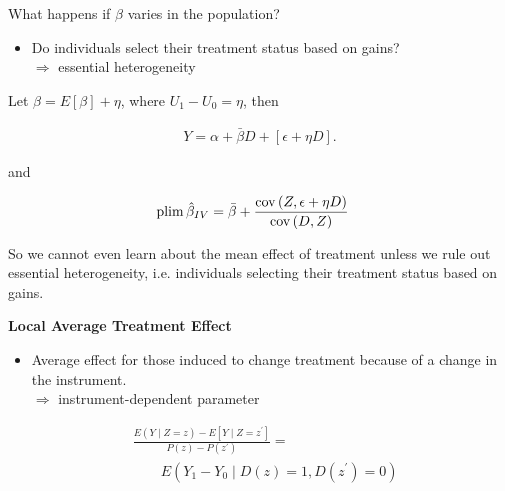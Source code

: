 \begin{frame}
What happens if $\beta$ varies in the population?\vspace{0.3cm}
\begin{itemize}\setlength\itemsep{1em}
\item Do individuals select their treatment status based on gains?\\\vspace{0.2cm}\hspace{0.3cm}$\Rightarrow$ essential heterogeneity
\end{itemize}
\end{frame}
\begin{frame}
Let $\beta = E[\beta] + \eta$, where $U_1 - U_0 = \eta$, then

\begin{align*}
Y = \alpha + \bar{\beta} D + [\epsilon + \eta D].
\end{align*}

and

\begin{align*}
\mathrm{plim}\thinspace \hat{\beta}_{IV} & = \bar{\beta} + \frac{\mathrm{cov}\thinspace(Z, \epsilon + \eta D)}{\mathrm{cov}\thinspace(D, Z)}
\end{align*}

So we cannot even learn about the mean effect of treatment unless we rule out essential heterogeneity, i.e. individuals selecting their treatment status based on gains.
\end{frame}
\begin{frame}\textbf{Local Average Treatment Effect}
\begin{itemize}\setlength\itemsep{1em}
\item Average effect for those induced
to change treatment because of a change in the instrument.\\\vspace{0.2cm}
\(\Rightarrow\) instrument-dependent parameter\vspace{0.4cm}
\end{itemize}

\begin{align*}
&\frac{E(Y\mid Z = z) - E[Y \mid Z = z^\prime]}{P(z) - P(z^\prime)} = \\
 &\qquad E(Y_1 - Y_0\mid D(z) = 1, D(z^\prime) = 0)
\end{align*}

\end{frame}

